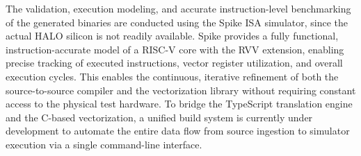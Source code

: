 The validation, execution modeling, and accurate instruction-level benchmarking of the generated binaries are conducted using the Spike ISA simulator, since the actual HALO silicon is not readily available. Spike provides a fully functional, instruction-accurate model of a RISC-V core with the RVV extension, enabling precise tracking of executed instructions, vector register utilization, and overall execution cycles. This enables the continuous, iterative refinement of both the source-to-source compiler and the vectorization library without requiring constant access to the physical test hardware. To bridge the TypeScript translation engine and the C-based vectorization, a unified build system is currently under development to automate the entire data flow from source ingestion to simulator execution via a single command-line interface.